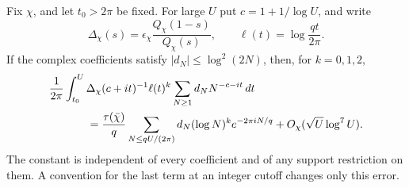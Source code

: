 \begin{lemma}
\label{lem:A046-stationary}
Fix \(\chi\), and let \(t_0>2\pi\) be fixed. For large \(U\)
put \(c=1+1/\log U\), and write
\[
 \Delta_\chi(s)=\epsilon_\chi
                \frac{Q_\chi(1-s)}{Q_\chi(s)},\qquad
                  \ell(t)=\log\frac{qt}{2\pi}.
\]
If the complex coefficients satisfy
\(|d_N|\le\log^2(2N)\), then, for \(k=0,1,2\),
\begin{align}\label{eq:A046-stationary}
 &\frac1{2\pi}\int_{t_0}^{U}
       \Delta_\chi(c+it)^{-1}\ell(t)^k
                           \sum_{N\ge1}d_NN^{-c-it}\,dt\\
 &\hspace{12mm}
   =\frac{\tau(\bar\chi)}q
         \sum_{N\le qU/(2\pi)}d_N(\log N)^k e^{-2\pi iN/q}
                   +O_\chi(\sqrt U\log^7 U).\nonumber
\end{align}
The constant is independent of every coefficient and of
any support restriction on them. A convention for the
last term at an integer cutoff changes only this error.
\end{lemma}

